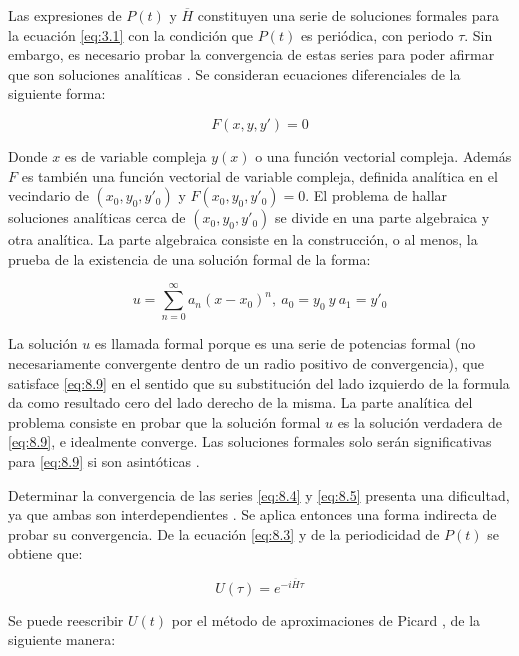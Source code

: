 Las expresiones de $P(t)$ y $\overline{H}$ constituyen una serie de soluciones formales para la ecuación \ref{eq:3.1} con la condición que $P(t)$ es periódica, con periodo $\tau$. Sin embargo, es necesario probar la convergencia de estas series para poder afirmar que son soluciones analíticas \cite{maricq}. Se consideran ecuaciones diferenciales de la siguiente forma:

\begin{equation}\label{eq:8.9}
    F(x, y, y') = 0
\end{equation}

Donde $x$ es de variable compleja $y(x)$ o una función vectorial compleja. Además $F$ es también una función vectorial de variable compleja, definida analítica en el vecindario de $(x_0,y_0,y'_0)$ y $F(x_0,y_0,y'_0)=0$. El problema de hallar soluciones analíticas cerca de $(x_0,y_0,y'_0)$ se divide en una parte algebraica y otra analítica. La parte algebraica consiste en la construcción, o al menos, la prueba de la existencia de una solución formal de la forma:

\begin{equation}\label{eq:8.10}
    u=\sum^{\infty}_{n=0}a_n(x-x_0)^n  ,   \ a_0=y_0 \ y \ a_1=y'_0
\end{equation}

La solución $u$ es llamada formal porque es una serie de potencias formal (no necesariamente convergente dentro de un radio positivo de convergencia), que satisface \ref{eq:8.9} en el sentido que su substitución del lado izquierdo de la formula da como resultado cero del lado derecho de la misma. La parte analítica del problema consiste en probar que la solución formal $u$ es la  solución verdadera de \ref{eq:8.9}, e idealmente converge. Las soluciones formales solo serán significativas para \ref{eq:8.9} si son asintóticas \cite{hautus}.

Determinar la convergencia de las series \ref{eq:8.4} y \ref{eq:8.5} presenta una dificultad, ya que ambas son interdependientes \cite{maricq}. Se aplica entonces una forma indirecta de probar su convergencia. De la ecuación \ref{eq:8.3} y de la periodicidad de $P(t)$ se obtiene que:

\begin{equation}\label{eq:8.11}
    U(\tau)=e^{-i\overline{H}\tau}
\end{equation}

Se puede reescribir  $U(t)$ por el método de aproximaciones de Picard \cite{ravi}\cite{maricq}, de la siguiente manera:

